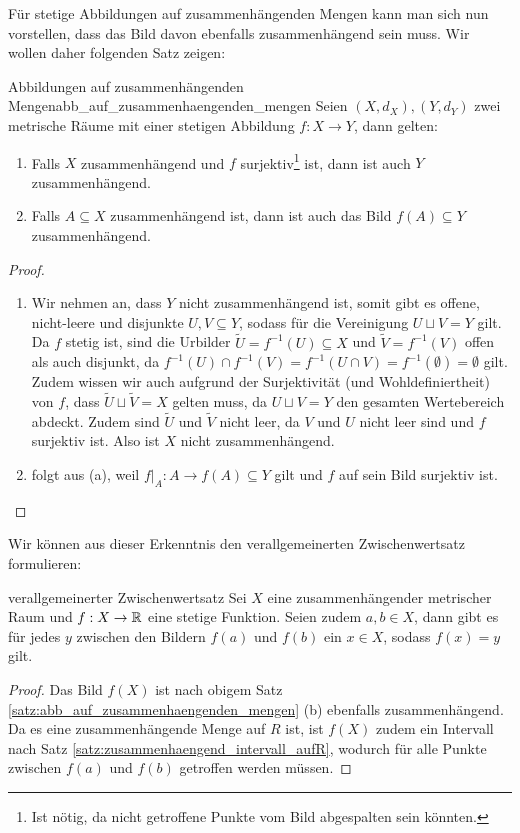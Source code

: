 Für stetige Abbildungen auf zusammenhängenden Mengen kann man sich nun vorstellen, dass das Bild davon ebenfalls zusammenhängend sein muss. Wir wollen daher folgenden Satz zeigen:

\begin{satz}{Abbildungen auf zusammenhängenden Mengen}{abb_auf_zusammenhaengenden_mengen}
Seien $(X,d_X), (Y, d_Y)$ zwei metrische Räume mit einer stetigen Abbildung $f : X \to Y$, dann gelten:
\begin{enumerate}[label=(\alph*)]
    \item Falls $X$ zusammenhängend und $f$ surjektiv\footnote{Ist nötig, da nicht getroffene Punkte vom Bild abgespalten sein könnten.} ist, dann ist auch $Y$ zusammenhängend.
    \item Falls $A \subseteq X$ zusammenhängend ist, dann ist auch das Bild $f(A) \subseteq Y$ zusammenhängend.
\end{enumerate}
\end{satz}
\begin{proof}
\begin{enumerate}[label=(\alph*)]
    \item Wir nehmen an, dass $Y$ nicht zusammenhängend ist, somit gibt es offene, nicht-leere und disjunkte $U, V \subseteq Y$, sodass für die Vereinigung $U \sqcup V = Y$ gilt. Da $f$ stetig ist, sind die Urbilder $\tilde{U} = f^{-1}(U) \subseteq X$ und $\tilde{V} = f^{-1}(V)$ offen als auch disjunkt, da $f^{-1}(U) \cap f^{-1}(V) = f^{-1}(U \cap V) = f^{-1}(\emptyset) = \emptyset$ gilt. Zudem wissen wir auch aufgrund der Surjektivität (und Wohldefiniertheit) von $f$, dass $\tilde{U} \sqcup \tilde{V} = X$ gelten muss, da $U \sqcup V = Y$ den gesamten Wertebereich abdeckt. Zudem sind $\tilde{U}$ und $\tilde{V}$ nicht leer, da $V$ und $U$ nicht leer sind und $f$ surjektiv ist. Also ist $X$ nicht zusammenhängend.
    \item folgt aus (a), weil $f\vert_A : A \to f(A) \subseteq Y$ gilt und $f$ auf sein Bild surjektiv ist.
\end{enumerate}
\end{proof}

Wir können aus dieser Erkenntnis den verallgemeinerten Zwischenwertsatz formulieren:
\begin{korollar}{verallgemeinerter Zwischenwertsatz}{}
Sei $X$ eine zusammenhängender metrischer Raum und $f: X \to \mathbb{R}$ eine stetige Funktion. Seien zudem $a,b \in X$, dann gibt es für jedes $y$ zwischen den Bildern $f(a)$ und $f(b)$ ein $x \in X$, sodass $f(x) = y$ gilt.
\end{korollar}
\begin{proof}
Das Bild $f(X)$ ist nach obigem Satz \ref{satz:abb_auf_zusammenhaengenden_mengen} (b) ebenfalls zusammenhängend. Da es eine zusammenhängende Menge auf $R$ ist, ist $f(X)$ zudem ein Intervall nach Satz \ref{satz:zusammenhaengend_intervall_aufR}, wodurch für alle Punkte zwischen $f(a)$ und $f(b)$ getroffen werden müssen.
\end{proof}

